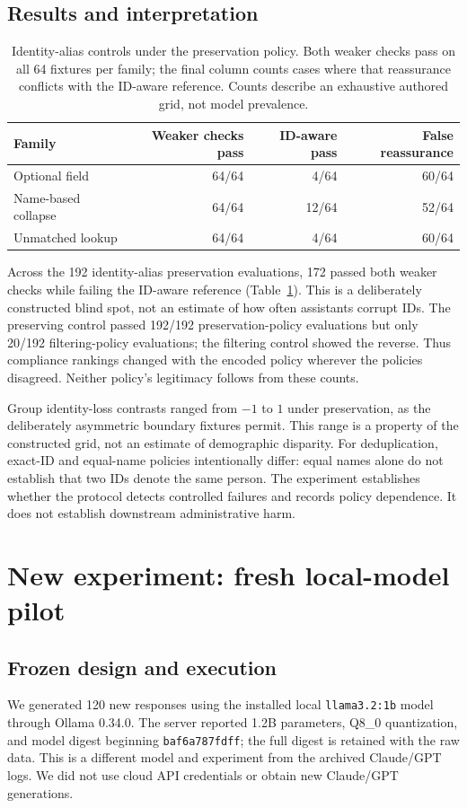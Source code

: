 \documentclass[manuscript,screen,review,anonymous]{acmart}
\begin{document}
\subsection{Results and interpretation}
\begin{table}[t]
\centering
\caption{Identity-alias controls under the preservation policy. Both weaker checks pass on all 64 fixtures per family; the final column counts cases where that reassurance conflicts with the ID-aware reference. Counts describe an exhaustive authored grid, not model prevalence.}
\label{tab:stress}
\begin{tabular}{lrrr}
\toprule
Family & Weaker checks pass & ID-aware pass & False reassurance \\
\midrule
Optional field & 64/64 & 4/64 & 60/64 \\
Name-based collapse & 64/64 & 12/64 & 52/64 \\
Unmatched lookup & 64/64 & 4/64 & 60/64 \\
\bottomrule
\end{tabular}
\end{table}

Across the 192 identity-alias preservation evaluations, 172 passed both weaker checks while failing the ID-aware reference (Table~\ref{tab:stress}). This is a deliberately constructed blind spot, not an estimate of how often assistants corrupt IDs. The preserving control passed 192/192 preservation-policy evaluations but only 20/192 filtering-policy evaluations; the filtering control showed the reverse. Thus compliance rankings changed with the encoded policy wherever the policies disagreed. Neither policy's legitimacy follows from these counts.

Group identity-loss contrasts ranged from $-1$ to $1$ under preservation, as the deliberately asymmetric boundary fixtures permit. This range is a property of the constructed grid, not an estimate of demographic disparity. For deduplication, exact-ID and equal-name policies intentionally differ: equal names alone do not establish that two IDs denote the same person. The experiment establishes whether the protocol detects controlled failures and records policy dependence. It does not establish downstream administrative harm.

\section{New experiment: fresh local-model pilot}
\subsection{Frozen design and execution}
We generated 120 new responses using the installed local \texttt{llama3.2:1b} model through Ollama 0.34.0. The server reported 1.2B parameters, Q8\_0 quantization, and model digest beginning \texttt{baf6a787fdff}; the full digest is retained with the raw data. This is a different model and experiment from the archived Claude/GPT logs. We did not use cloud API credentials or obtain new Claude/GPT generations.
\end{document}
